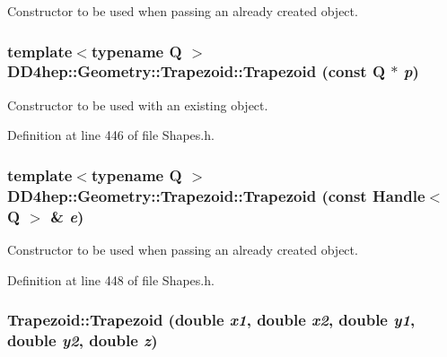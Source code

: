 Constructor to be used when passing an already created object. \hypertarget{class_d_d4hep_1_1_geometry_1_1_trapezoid_a247acae1b4a9f18d7d996af8faf669ca}{
\subsubsection[{Trapezoid}]{\setlength{\rightskip}{0pt plus 5cm}template$<$typename Q $>$ DD4hep::Geometry::Trapezoid::Trapezoid (const Q $\ast$ {\em p})}}
\label{class_d_d4hep_1_1_geometry_1_1_trapezoid_a247acae1b4a9f18d7d996af8faf669ca}


Constructor to be used with an existing object. 

Definition at line 446 of file Shapes.h.\hypertarget{class_d_d4hep_1_1_geometry_1_1_trapezoid_a9aee37748ae477139a44b6f7c25ef4f4}{
\subsubsection[{Trapezoid}]{\setlength{\rightskip}{0pt plus 5cm}template$<$typename Q $>$ DD4hep::Geometry::Trapezoid::Trapezoid (const {\bf Handle}$<$ Q $>$ \& {\em e})}}
\label{class_d_d4hep_1_1_geometry_1_1_trapezoid_a9aee37748ae477139a44b6f7c25ef4f4}


Constructor to be used when passing an already created object. 

Definition at line 448 of file Shapes.h.\hypertarget{class_d_d4hep_1_1_geometry_1_1_trapezoid_a3c8b1150038001c51909aab4350c7228}{
\subsubsection[{Trapezoid}]{\setlength{\rightskip}{0pt plus 5cm}Trapezoid::Trapezoid (double {\em x1}, \/  double {\em x2}, \/  double {\em y1}, \/  double {\em y2}, \/  double {\em z})}}
\label{class_d_d4hep_1_1_geometry_1_1_trapezoid_a3c8b1150038001c51909aab4350c7228}


